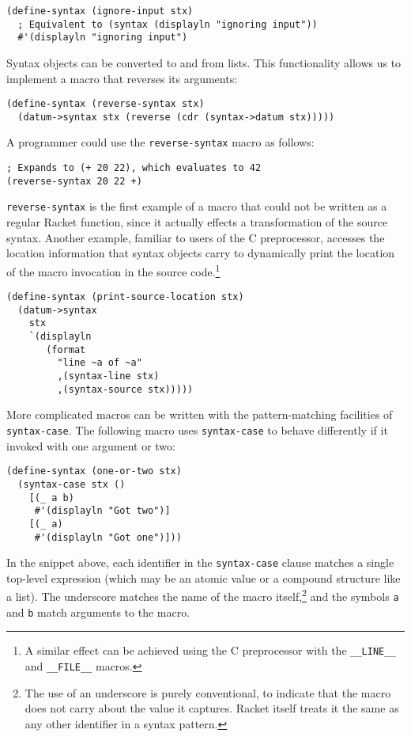 \documentclass{article}
\begin{document}
\begin{lstlisting}
(define-syntax (ignore-input stx)
  ; Equivalent to (syntax (displayln "ignoring input"))
  #'(displayln "ignoring input")
\end{lstlisting}

Syntax objects can be converted to and from lists. This functionality allows us to implement a macro that reverses its arguments:

\begin{lstlisting}
(define-syntax (reverse-syntax stx)
  (datum->syntax stx (reverse (cdr (syntax->datum stx)))))
\end{lstlisting}

A programmer could use the \texttt{reverse-syntax} macro as follows:

\begin{lstlisting}
; Expands to (+ 20 22), which evaluates to 42
(reverse-syntax 20 22 +)
\end{lstlisting}

\texttt{reverse-syntax} is the first example of a macro that could not be written as a regular Racket function, since it actually effects a transformation of the source syntax. Another example, familiar to users of the C preprocessor, accesses the location information that syntax objects carry to dynamically print the location of the macro invocation in the source code.\footnote{A similar effect can be achieved using the C preprocessor with the \texttt{\_\_LINE\_\_} and \texttt{\_\_FILE\_\_} macros.}

\begin{lstlisting}
(define-syntax (print-source-location stx)
  (datum->syntax
    stx
    `(displayln
       (format
         "line ~a of ~a"
         ,(syntax-line stx)
         ,(syntax-source stx)))))
\end{lstlisting}

More complicated macros can be written with the pattern-matching facilities of \texttt{syntax-case}. The following macro uses \texttt{syntax-case} to behave differently if it invoked with one argument or two:

\begin{lstlisting}
(define-syntax (one-or-two stx)
  (syntax-case stx ()
    [(_ a b)
     #'(displayln "Got two")]
    [(_ a)
     #'(displayln "Got one")]))
\end{lstlisting}

In the snippet above, each identifier in the \texttt{syntax-case} clause matches a single top-level expression (which may be an atomic value or a compound structure like a list). The underscore matches the name of the macro itself,\footnote{The use of an underscore is purely conventional, to indicate that the macro does not carry about the value it captures. Racket itself treats it the same as any other identifier in a syntax pattern.} and the symbols \texttt{a} and \texttt{b} match arguments to the macro.
\end{document}
